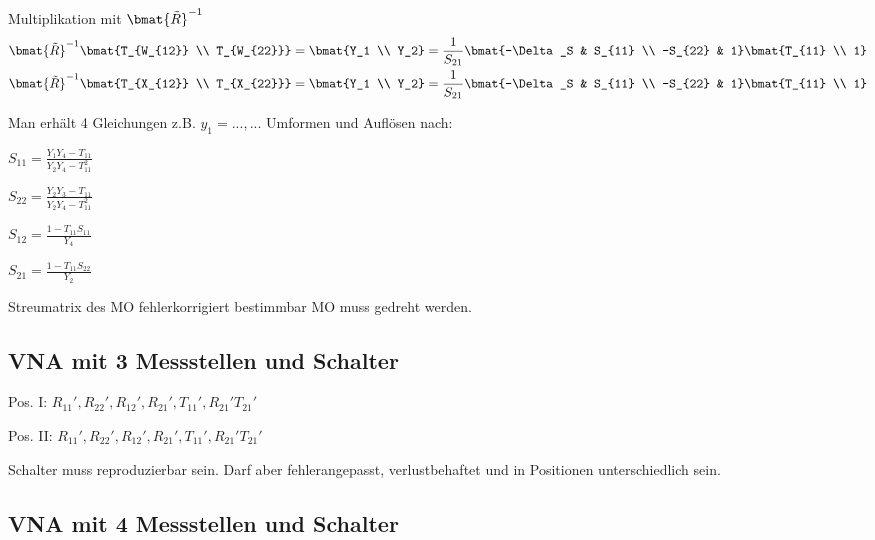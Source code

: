 Multiplikation mit $\bmat{\tilde{R}}^{-1}$
\begin{align*}
    \bmat{\tilde{R}}^{-1}\bmat{T_{W_{12}} \\ T_{W_{22}}} &= \bmat{Y_1 \\ Y_2} = \frac{1}{S_{21}}\bmat{-\Delta_S & S_{11} \\ -S_{22} & 1} \bmat{T_{11} \\ 1} \\
    \bmat{\tilde{R}}^{-1}\bmat{T_{X_{12}} \\ T_{X_{22}}} &= \bmat{Y_1 \\ Y_2} = \frac{1}{S_{21}}\bmat{-\Delta_S & S_{11} \\ -S_{22} & 1} \bmat{T_{11} \\ 1} \\
\end{align*}

Man erhält 4 Gleichungen z.B. $y_1= ..., ...$
Umformen und Auflösen nach:
\begin{pitemize}
    \item $S_{11} = \frac{Y_1Y_4 - T_{11}}{Y_2Y_4 - T_{11}^2}$
    \item $S_{22} = \frac{Y_2Y_3 - T_{11}}{Y_2Y_4 - T_{11}^2}$
    \item $S_{12} = \frac{1 - T_{11}S_{11}}{Y_4}$
    \item $S_{21} = \frac{1 - T_{11}S_{22}}{Y_2}$ 
\end{pitemize}

Streumatrix des MO fehlerkorrigiert bestimmbar
MO muss gedreht werden.

\subsection{VNA mit 3 Messstellen und Schalter}


\begin{pitemize}
    \item Pos. I: $R_{11}',R_{22}',R_{12}',R_{21}', T_{11}', R_{21}' T_{21}'$
    \item Pos. II: $R_{11}',R_{22}',R_{12}',R_{21}', T_{11}', R_{21}' T_{21}'$
    \item Schalter muss reproduzierbar sein. Darf aber fehlerangepasst, verlustbehaftet und in Positionen unterschiedlich sein.
\end{pitemize}


\subsection{VNA mit 4 Messstellen und Schalter}

